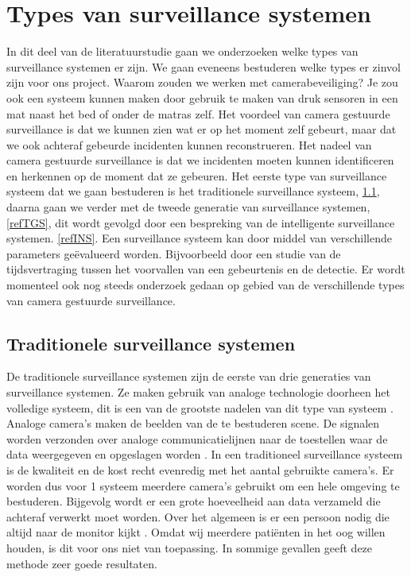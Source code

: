 \section{Types van surveillance systemen}
\label{refTVS}
In dit deel van de literatuurstudie gaan we onderzoeken welke types van surveillance systemen er zijn. We gaan eveneens bestuderen welke types er zinvol zijn voor ons project. Waarom zouden we werken met camerabeveiliging? Je zou ook een systeem kunnen maken door gebruik te maken van druk sensoren in een mat naast het bed of onder de matras zelf. Het voordeel van camera gestuurde surveillance is dat we kunnen zien wat er op het moment zelf gebeurt, maar dat we ook achteraf gebeurde incidenten kunnen reconstrueren. Het nadeel van camera gestuurde surveillance is dat we incidenten moeten kunnen identificeren en herkennen op de moment dat ze gebeuren\cite{bibVTC3}. Het eerste type van surveillance systeem dat we gaan bestuderen is het traditionele surveillance systeem, \ref{refTST}, daarna gaan we verder met de tweede generatie van surveillance systemen, \ref{refTGS}, dit wordt gevolgd door een bespreking van de intelligente surveillance systemen. \ref{refINS}.  Een surveillance systeem kan door middel van verschillende parameters ge\"evalueerd worden. Bijvoorbeeld door een studie van de tijdsvertraging tussen het voorvallen van een gebeurtenis en de detectie. Er wordt momenteel ook nog steeds onderzoek gedaan op gebied van de verschillende types van camera gestuurde surveillance. 

\subsection{Traditionele surveillance systemen}
\label{refTST}
De traditionele surveillance systemen zijn de eerste van drie generaties van surveillance systemen. Ze maken gebruik van analoge technologie doorheen het volledige systeem, dit is een van de grootste nadelen van dit type van systeem \cite{bibIPC2}.  Analoge camera's maken de beelden van de te bestuderen scene. De signalen worden verzonden over analoge communicatielijnen naar de  toestellen waar de data weergegeven en opgeslagen worden \cite{bibVTC2}.
In een traditioneel surveillance systeem is de kwaliteit en de kost recht evenredig met het aantal gebruikte camera's. Er worden dus voor 1 systeem meerdere camera's gebruikt om een hele omgeving te bestuderen. Bijgevolg wordt er een grote hoeveelheid aan data verzameld die achteraf verwerkt moet worden. Over het algemeen is er een persoon nodig die altijd naar de monitor kijkt \cite{bibVTC}. Omdat wij meerdere pati\"enten in het oog willen houden, is dit voor ons niet van toepassing. In sommige gevallen geeft deze methode zeer goede resultaten. 

